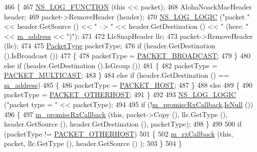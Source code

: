 \begin{DoxyCode}
466 \{
467   \hyperlink{log-macros-disabled_8h_a90b90d5bad1f39cb1b64923ea94c0761}{NS\_LOG\_FUNCTION} (\textcolor{keyword}{this} << packet);
468   AlohaNoackMacHeader header;
469   packet->RemoveHeader (header);
470   \hyperlink{group__logging_ga88acd260151caf2db9c0fc84997f45ce}{NS\_LOG\_LOGIC} (\textcolor{stringliteral}{"packet "} << header.GetSource () << \textcolor{stringliteral}{" --> "} << header.GetDestination () << \textcolor{stringliteral}{"
       (here: "} << \hyperlink{classns3_1_1AlohaNoackNetDevice_a166639a91b87662cb798ead280bee700}{m\_address} << \textcolor{stringliteral}{")"});
471 
472   LlcSnapHeader llc;
473   packet->RemoveHeader (llc);
474 
475   \hyperlink{classns3_1_1NetDevice_ace65153f09144f55a0d3e702fc29d6b2}{PacketType} packetType;
476   \textcolor{keywordflow}{if} (header.GetDestination ().IsBroadcast ())
477     \{
478       packetType = \hyperlink{classns3_1_1NetDevice_ace65153f09144f55a0d3e702fc29d6b2adfeb6a2929cee183836a32fe293ce205}{PACKET\_BROADCAST};
479     \}
480   \textcolor{keywordflow}{else} \textcolor{keywordflow}{if} (header.GetDestination ().IsGroup ())
481     \{
482       packetType = \hyperlink{classns3_1_1NetDevice_ace65153f09144f55a0d3e702fc29d6b2ae3ffb88d364e97f06f662f5d7ba53bbe}{PACKET\_MULTICAST};
483     \}
484   \textcolor{keywordflow}{else} \textcolor{keywordflow}{if} (header.GetDestination () == \hyperlink{classns3_1_1AlohaNoackNetDevice_a166639a91b87662cb798ead280bee700}{m\_address})
485     \{
486       packetType = \hyperlink{classns3_1_1NetDevice_ace65153f09144f55a0d3e702fc29d6b2a60835731aced24ac0c712ba61e62462e}{PACKET\_HOST};
487     \}
488   \textcolor{keywordflow}{else}
489     \{
490       packetType = \hyperlink{classns3_1_1NetDevice_ace65153f09144f55a0d3e702fc29d6b2a60c00fab4286dd2903e2b197a9f8c6c8}{PACKET\_OTHERHOST};
491     \}
492 
493   \hyperlink{group__logging_ga88acd260151caf2db9c0fc84997f45ce}{NS\_LOG\_LOGIC} (\textcolor{stringliteral}{"packet type = "} << packetType);
494 
495   \textcolor{keywordflow}{if} (!\hyperlink{classns3_1_1AlohaNoackNetDevice_a2b1602e67228e9d99e925e633dc8b219}{m\_promiscRxCallback}.\hyperlink{classns3_1_1Callback_aa8e27826badbf37f84763f36f70d9b54}{IsNull} ())
496     \{
497       \hyperlink{classns3_1_1AlohaNoackNetDevice_a2b1602e67228e9d99e925e633dc8b219}{m\_promiscRxCallback} (\textcolor{keyword}{this}, packet->Copy (), llc.GetType (), header.GetSource (), 
      header.GetDestination (), packetType);
498     \}
499 
500   \textcolor{keywordflow}{if} (packetType != \hyperlink{classns3_1_1NetDevice_ace65153f09144f55a0d3e702fc29d6b2a60c00fab4286dd2903e2b197a9f8c6c8}{PACKET\_OTHERHOST})
501     \{
502       \hyperlink{classns3_1_1AlohaNoackNetDevice_a1b3e4080b2399f5cd2ddf4fc48b9da1a}{m\_rxCallback} (\textcolor{keyword}{this}, packet, llc.GetType (), header.GetSource () );
503     \}
504 \}
\end{DoxyCode}


